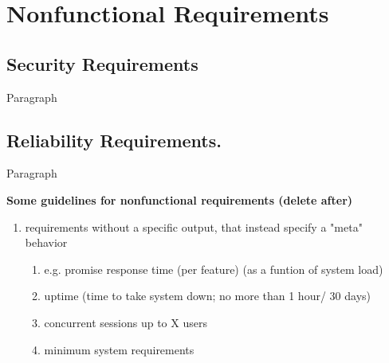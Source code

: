 \section{Nonfunctional Requirements}

\subsection{Security Requirements}
\par{
Paragraph 
}

\subsection{Reliability Requirements.}
\par{

Paragraph
}



\textbf{Some guidelines for nonfunctional requirements (delete after)}
\begin{enumerate}
    \item requirements without a specific output, that instead specify a "meta" behavior

    \begin{enumerate}
        \item e.g. promise response time (per feature) (as a funtion of system load)
        \item uptime (time to take system down; no more than 1 hour/ 30 days)
        \item concurrent sessions up to X users
        \item minimum system requirements 
    \end{enumerate}
\end{enumerate}
















